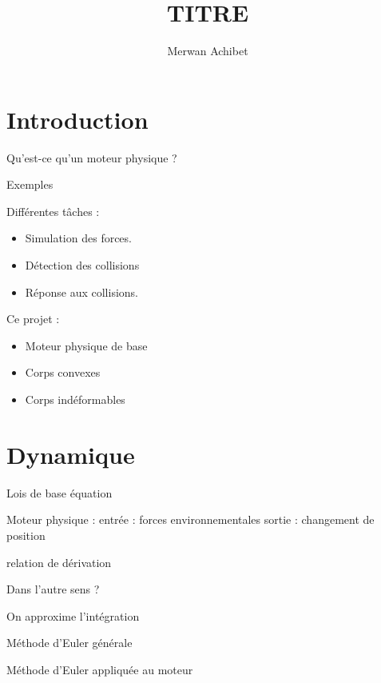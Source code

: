 \documentclass{beamer}
\title{TITRE}
\author{Merwan Achibet}
\date{}
\begin{document}
\begin{frame}
  \maketitle
\end{frame}

\section{Introduction}

\begin{frame}
  Qu'est-ce qu'un moteur physique ?

  Exemples
\end{frame}

\begin{frame}
  Différentes tâches :
  \begin{itemize}
    \item Simulation des forces.
    \item Détection des collisions
    \item Réponse aux collisions.
    \end{itemize}
\end{frame}

\begin{frame}
  Ce projet :
  \begin{itemize}
    \item Moteur physique de base
    \item Corps convexes
    \item Corps indéformables
  \end{itemize}
\end{frame}

\section{Dynamique}

\begin{frame}
  Lois de base
  équation

  Moteur physique :
  entrée : forces environnementales
  sortie : changement de position

  relation de dérivation

  Dans l'autre sens ?
\end{frame}

\begin{frame}
  On approxime l'intégration

  Méthode d'Euler générale

  Méthode d'Euler appliquée au moteur
\end{frame}
\end{document}

